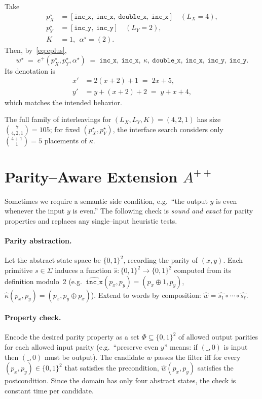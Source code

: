 \documentclass[11pt]{article}
\begin{document}
Take
\begin{align*}
p_X^\star &= [\texttt{inc\_x},\ \texttt{inc\_x},\ \texttt{double\_x},\ \texttt{inc\_x}] \quad (L_X{=}4),\\
p_Y^\star &= [\texttt{inc\_y},\ \texttt{inc\_y}] \quad (L_Y{=}2),\\
K&=1,\ \ \alpha^\star=(2).
\end{align*}
Then, by~\eqref{eq:eplus},
\[
w^\star \;=\; e^{+}(p_X^\star,p_Y^\star,\alpha^\star)\;=\;
\texttt{inc\_x},\ \texttt{inc\_x},\ \kappa,\ \texttt{double\_x},\ \texttt{inc\_x},\ \texttt{inc\_y},\ \texttt{inc\_y}.
\]
Its denotation is
\begin{align*}
x' &= 2(x{+}2)+1 \;=\; 2x+5,\\
y' &= y + (x{+}2) + 2 \;=\; y + x + 4,
\end{align*}
which matches the intended behavior.

The full family of interleavings for $(L_X,L_Y,K)=(4,2,1)$ has size $\binom{7}{4,2,1}=105$; for fixed $(p_X^\star,p_Y^\star)$, the interface search considers only $\binom{4+1}{1}=5$ placements of $\kappa$.

\section{Parity--Aware Extension \texorpdfstring{$A^{++}$}{A++}}\label{sec:parity}
Sometimes we require a semantic side condition, e.g.\ ``the output $y$ is even whenever the input $y$ is even.'' The following check is \emph{sound and exact} for parity properties and replaces any single--input heuristic tests.

\paragraph{Parity abstraction.} Let the abstract state space be $\{0,1\}^2$, recording the parity of $(x,y)$. Each primitive $s\in\Sigma$ induces a function $\widehat{s}:\{0,1\}^2\to\{0,1\}^2$ computed from its definition modulo~2 (e.g.\ $\widehat{\texttt{inc\_x}}(p_x,p_y)=(p_x\oplus1,p_y)$, $\widehat{\kappa}(p_x,p_y)=(p_x,p_y\oplus p_x)$). Extend to words by composition: $\widehat{w}=\widehat{s_1}\circ\cdots\circ\widehat{s_\ell}$.

\paragraph{Property check.} Encode the desired parity property as a set $\Phi\subseteq\{0,1\}^2$ of allowed output parities for each allowed input parity (e.g.\ ``preserve even $y$'' means: if $(\_,0)$ is input then $(\_,0)$ must be output). The candidate $w$ passes the filter iff for every $(p_x,p_y)\in\{0,1\}^2$ that satisfies the precondition, $\widehat{w}(p_x,p_y)$ satisfies the postcondition. Since the domain has only four abstract states, the check is constant time per candidate.
\end{document}
